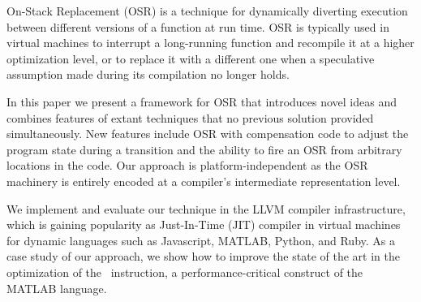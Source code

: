 
On-Stack Replacement (OSR) is a technique for dynamically diverting execution between different versions of a function at run time.
OSR is typically used in virtual machines to interrupt a long-running function and recompile it at a higher optimization level, or to replace it with a different one when a speculative assumption made during its compilation no longer holds.

In this paper we present a framework for OSR that introduces novel ideas and combines features of extant techniques that no previous solution provided simultaneously. New features include OSR with compensation code to adjust the program state during a transition and the ability to fire an OSR from arbitrary locations in the code. Our approach is platform-independent as the OSR machinery is entirely encoded at a compiler's intermediate representation level.



We implement and evaluate our technique in the LLVM compiler infrastructure, which is gaining popularity as Just-In-Time (JIT) compiler in virtual machines for dynamic languages such as Javascript, MATLAB, Python, and Ruby. As a case study of our approach, we show how to improve the state of the art in the optimization of the \feval\ instruction, a performance-critical construct of the MATLAB language.

  
  
  
  
  
  
  
  
  